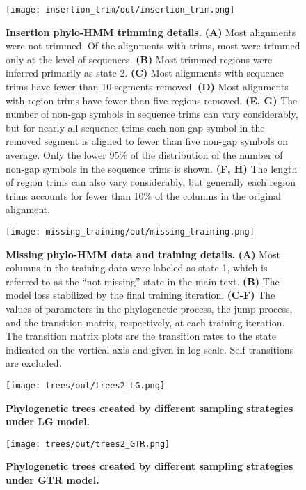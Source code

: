 \begin{figure}[h!]
\texttt{[image: insertion\_trim/out/insertion\_trim.png]}
\centering
\caption{\textbf{Insertion phylo-HMM trimming details.}
\textbf{(A)} Most alignments were not trimmed. Of the alignments with trims, most were trimmed only at the level of sequences. \textbf{(B)} Most trimmed regions were inferred primarily as state 2. \textbf{(C)} Most alignments with sequence trims have fewer than 10 segments removed. \textbf{(D)} Most alignments with region trims have fewer than five regions removed. \textbf{(E, G)} The number of non-gap symbols in sequence trims can vary considerably, but for nearly all sequence trims each non-gap symbol in the removed segment is aligned to fewer than five non-gap symbols on average. Only the lower 95\% of the distribution of the number of non-gap symbols in the sequence trims is shown. \textbf{(F, H)} The length of region trims can also vary considerably, but generally each region trims accounts for fewer than 10\% of the columns in the original alignment.}
\label{sfig:insertion_trim}
\end{figure}

\begin{figure}[h!]
\texttt{[image: missing\_training/out/missing\_training.png]}
\centering
\caption{\textbf{Missing phylo-HMM data and training details.}
\textbf{(A)} Most columns in the training data were labeled as state 1, which is referred to as the ``not missing'' state in the main text. \textbf{(B)} The model loss stabilized by the final training iteration. \textbf{(C-F)} The values of parameters in the phylogenetic process, the jump process, and the transition matrix, respectively, at each training iteration. The transition matrix plots are the transition rates to the state indicated on the vertical axis and given in log scale. Self transitions are excluded.}
\label{sfig:missing_training}
\end{figure}

\begin{figure}[h!]
\texttt{[image: trees/out/trees2\_LG.png]}
\centering
\caption{\textbf{Phylogenetic trees created by different sampling strategies under LG model.}}
\label{sfig:trees_LG}
\end{figure}

\begin{figure}[h!]
\texttt{[image: trees/out/trees2\_GTR.png]}
\centering
\caption{\textbf{Phylogenetic trees created by different sampling strategies under GTR model.}}
\label{sfig:trees_GTR}
\end{figure}

